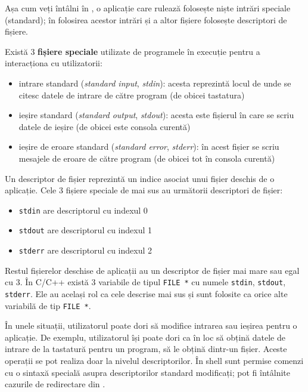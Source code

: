 Așa cum veți întâlni în , o aplicație care rulează folosește niște intrări speciale (standard); în folosirea acestor intrări și a altor fișiere folosește descriptori de fișiere.

Există 3 \textbf{fișiere speciale} utilizate de programele în execuție pentru a interacționa cu utilizatorii:

\begin{itemize}
  \item intrare standard (\textit{standard input}, \textit{stdin}): acesta reprezintă locul de unde se citesc datele de intrare de către program (de obicei tastatura)
  \item ieșire standard (\textit{standard output}, \textit{stdout}): acesta este fișierul în care se scriu datele de ieșire (de obicei este consola curentă)
  \item ieșire de eroare standard (\textit{standard error}, \textit{stderr}): în acest fișier se scriu mesajele de eroare de către program (de obicei tot în consola curentă)
\end{itemize}

Un descriptor de fișier reprezintă un indice asociat unui fișier deschis de o aplicație. Cele 3 fișiere speciale de mai sus au următorii descriptori de fișier:

\begin{itemize}
  \item \texttt{stdin} are descriptorul cu indexul 0
  \item \texttt{stdout} are descriptorul cu indexul 1
  \item \texttt{stderr} are descriptorul cu indexul 2
\end{itemize}

Restul fișierelor deschise de aplicații au un descriptor de fișier mai mare sau egal cu 3. În C/C++ există 3 variabile de tipul \texttt{FILE *} cu numele \texttt{stdin}, \texttt{stdout}, \texttt{stderr}. Ele au același rol ca cele descrise mai sus și sunt folosite ca orice alte variabilă de tip \texttt{FILE *}.

În unele situații, utilizatorul poate dori să modifice intrarea sau ieșirea pentru o aplicație. De exemplu, utilizatorul își poate dori ca în loc să obțină datele de intrare de la tastatură pentru un program, să le obțină dintr-un fișier. Aceste operații se pot realiza doar la nivelul descriptorilor. În shell sunt permise comenzi cu o sintaxă specială asupra descriptorilor standard modificați; pot fi întâlnite cazurile de redirectare din .

